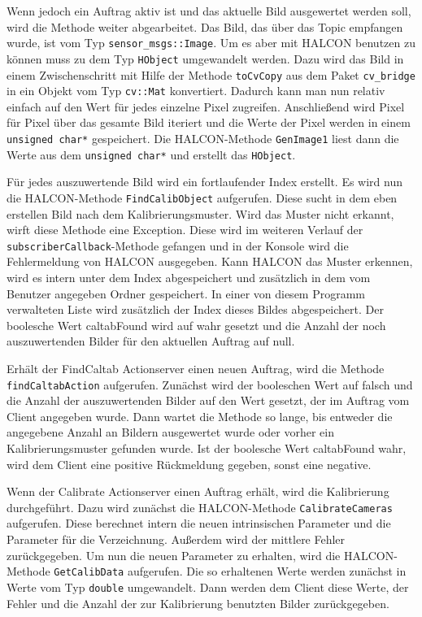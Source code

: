 Wenn jedoch ein Auftrag aktiv ist und das aktuelle Bild ausgewertet werden soll, wird die Methode weiter abgearbeitet. Das Bild, das über das Topic empfangen wurde, ist vom Typ \texttt{sensor\_msgs::Image}. Um es aber mit HALCON benutzen zu können muss zu dem Typ \texttt{HObject} umgewandelt werden. Dazu wird das Bild in einem Zwischenschritt mit Hilfe der Methode \texttt{toCvCopy} aus dem Paket \texttt{cv\_bridge} in ein Objekt vom Typ \texttt{cv::Mat} konvertiert. Dadurch kann man nun relativ einfach auf den Wert für jedes einzelne Pixel zugreifen. Anschließend wird Pixel für Pixel über das gesamte Bild iteriert und die Werte der Pixel werden in einem \texttt{unsigned char*} gespeichert. Die HALCON-Methode \texttt{GenImage1} liest dann die Werte aus dem \texttt{unsigned char*} und erstellt das \texttt{HObject}.

Für jedes auszuwertende Bild wird ein fortlaufender Index erstellt. Es wird nun die HALCON-Methode \texttt{FindCalibObject} aufgerufen. Diese sucht in dem eben erstellen Bild nach dem Kalibrierungsmuster. Wird das Muster nicht erkannt, wirft diese Methode eine Exception. Diese wird im weiteren Verlauf der \texttt{subscriberCallback}-Methode gefangen und in der Konsole wird die Fehlermeldung von HALCON ausgegeben. Kann HALCON das Muster erkennen, wird es intern unter dem Index abgespeichert und zusätzlich in dem vom Benutzer angegeben Ordner gespeichert. In einer von diesem Programm verwalteten Liste wird zusätzlich der Index dieses Bildes abgespeichert. Der boolesche Wert caltabFound wird auf wahr gesetzt und die Anzahl der noch auszuwertenden Bilder für den aktuellen Auftrag auf null. 

Erhält der FindCaltab Actionserver einen neuen Auftrag, wird die Methode \texttt{findCaltabAction} aufgerufen. Zunächst wird der booleschen Wert auf falsch und die Anzahl der auszuwertenden Bilder auf den Wert gesetzt, der im Auftrag vom Client angegeben wurde. Dann wartet die Methode so lange, bis entweder die angegebene Anzahl an Bildern ausgewertet wurde oder vorher ein Kalibrierungsmuster gefunden wurde. Ist der boolesche Wert caltabFound wahr, wird dem Client eine positive Rückmeldung gegeben, sonst eine negative.

Wenn der Calibrate Actionserver einen Auftrag erhält, wird die Kalibrierung durchgeführt. Dazu wird zunächst die HALCON-Methode \texttt{CalibrateCameras} aufgerufen. Diese berechnet intern die neuen intrinsischen Parameter und die Parameter für die Verzeichnung. Außerdem wird der mittlere Fehler zurückgegeben. Um nun die neuen Parameter zu erhalten, wird die HALCON-Methode \texttt{GetCalibData} aufgerufen. Die so erhaltenen Werte werden zunächst in Werte vom Typ \texttt{double} umgewandelt. Dann werden dem Client diese Werte, der Fehler und die Anzahl der zur Kalibrierung benutzten Bilder zurückgegeben.

